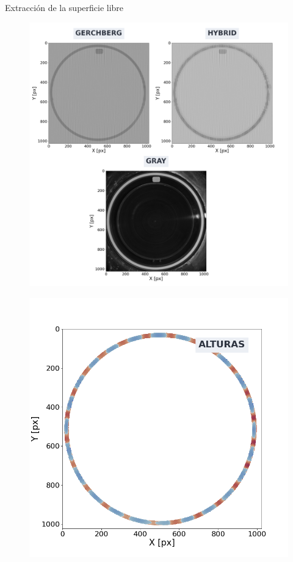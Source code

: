 \documentclass[aspectratio=169]{beamer}
\begin{document}
\begin{frame}{Extracción de la superficie libre} %
	\begin{minipage}{0.49\textwidth}
	  \begin{figure}
	    \includegraphics[width=0.85\linewidth]{figs/ftp_collage.png}
	  \end{figure}
	\end{minipage} \hfill
	\begin{minipage}{0.49\textwidth}
	  \begin{figure}
	    \includegraphics[width=\linewidth]{figs/alturas.png}
	  \end{figure}
	\end{minipage}
\end{frame}
\end{document}

